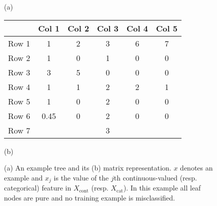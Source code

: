 \begin{figure}
\begin{minipage}{0.3\linewidth}
\begin{center}
\end{center}
\begin{center}
(a)
\end{center}
\end{minipage}
\hfill
\begin{minipage}{0.65\linewidth}
\begin{center}
\begin{tabular}{c|c|c|c|c|c|}
& Col 1 & Col 2 & Col 3 & Col 4 & Col 5\\
\hline
Row 1 & 1 & 2 & 3 & 6 & 7 \\
\hline
Row 2 & 1 & 0 & 1 & 0 & 0 \\
\hline
Row 3 & 3 & 5 & 0 & 0 & 0 \\
\hline
Row 4 & 1 & 1 & 2 & 2 & 1 \\
\hline
Row 5 & 1 & 0 & 2 & 0 & 0 \\
\hline
Row 6 & 0.45 & 0 & 2 & 0 & 0 \\
\hline
Row 7 &  &  & 3 &  & \\
\hline
\end{tabular}
\end{center}
\begin{center}
(b)
\end{center}
\end{minipage}
\caption{(a) An example tree and its (b) matrix representation. $x$ denotes an example and $x_j$ is the value of the $j$th continuous-valued (resp. categorical) feature in $X_\text{cont}$ (resp. $X_\text{cat}$). In this example all leaf nodes are pure and no training example is misclassified.}
\label{dtree}
\end{figure}


